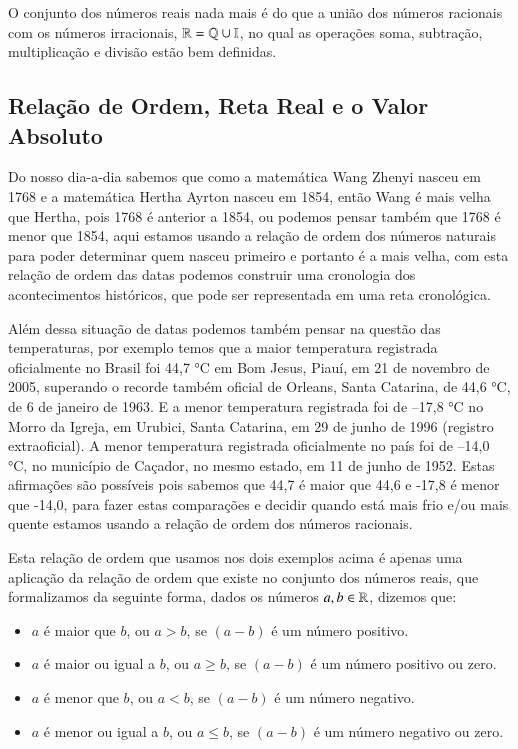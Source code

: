 O conjunto dos números reais nada mais é do que a união dos números racionais com os números irracionais, $\mathbb{R}= \mathbb{Q} \cup \mathbb{I}$, no qual as operações soma, subtração, multiplicação e divisão estão bem definidas.

\subsection{Relação de Ordem, Reta Real e o Valor Absoluto}

Do nosso dia-a-dia sabemos que como a matemática Wang Zhenyi nasceu em 1768 e a matemática Hertha Ayrton nasceu em 1854, então Wang é mais velha que Hertha, pois 1768 é anterior a 1854, ou podemos pensar também que 1768 é  menor que 1854, aqui estamos usando a relação de ordem dos números naturais para poder determinar quem nasceu primeiro e portanto é a mais velha, com esta relação de ordem das datas podemos construir uma cronologia dos acontecimentos históricos, que pode ser representada em uma reta cronológica.

Além dessa situação de datas podemos também pensar na questão das temperaturas, por exemplo temos que a maior temperatura registrada oficialmente no Brasil foi 44,7 °C em Bom Jesus, Piauí, em 21 de novembro de 2005, superando o recorde também oficial de Orleans, Santa Catarina, de 44,6 °C, de 6 de janeiro de 1963. E a menor temperatura registrada foi de –17,8 °C no Morro da Igreja, em Urubici, Santa Catarina, em 29 de junho de 1996 (registro extraoficial). A menor temperatura registrada oficialmente no país foi de –14,0 °C, no município de Caçador, no mesmo estado, em 11 de junho de 1952. Estas afirmações são possíveis pois sabemos que 44,7 é maior que 44,6 e -17,8 é menor que -14,0, para fazer estas comparações e decidir quando está mais frio e/ou mais quente estamos usando a relação de ordem dos números racionais.

Esta relação de ordem que usamos nos dois exemplos acima é apenas uma aplicação da relação de ordem que existe no conjunto dos números reais, que formalizamos da seguinte forma, dados os números $a, b \in \mathbb{R}$, dizemos que:

\begin{itemize}
\item $a$ é maior que $b$, ou $a > b$, se $(a - b)$ é um número positivo.
\item $a$ é maior ou igual a $b$, ou $a \geq b$, se $(a - b)$ é um número positivo ou zero.
\item $a$ é menor que $b$, ou $a < b$, se $(a - b)$ é um número negativo.
\item $a$ é menor ou igual a $b$, ou $a \leq b$, se $(a - b)$ é um número negativo ou zero.
\end{itemize}

